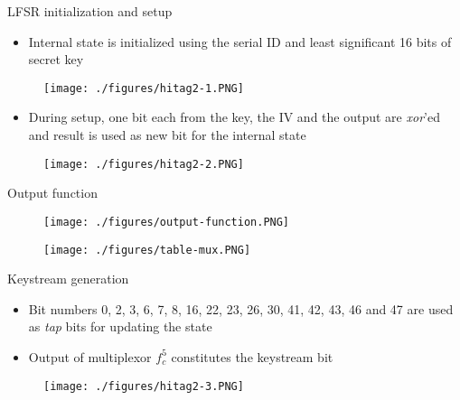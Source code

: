 \documentclass{beamer}
\begin{document}
\begin{frame}{LFSR initialization and setup}
\begin{itemize}
	\item \small{Internal state is initialized using the serial ID and least significant 16 bits of secret key}
\end{itemize}
	\begin{figure}[htp]
	\centering
	\texttt{[image: ./figures/hitag2-1.PNG]}
	\end{figure}
\begin{itemize}
		\item \small{During setup, one bit each from the key, the IV and the output are \textit{xor}'ed and result is used as new bit for the internal state}
\end{itemize}

	\begin{figure}[htp]
	\centering
	\texttt{[image: ./figures/hitag2-2.PNG]}
	\end{figure}
	
\end{frame}

\begin{frame}{Output function}

	\begin{figure}[htp]
	\centering
	\texttt{[image: ./figures/output-function.PNG]}
	\end{figure}
	
	\begin{figure}[htp]
	\centering
	\texttt{[image: ./figures/table-mux.PNG]}
	\end{figure}

\end{frame}

\begin{frame}{Keystream generation}
\begin{itemize} 
	\item Bit numbers 0, 2, 3, 6, 7, 8, 16, 22, 23, 26, 30, 41, 42, 43, 46 and 47 are used as \textit{tap} bits for updating the state
	\item Output of multiplexor $f_c^5$ constitutes the keystream bit
\end{itemize}

	\begin{figure}[htp]
	\centering
	\texttt{[image: ./figures/hitag2-3.PNG]}
	\end{figure}

\end{frame}
\end{document}

